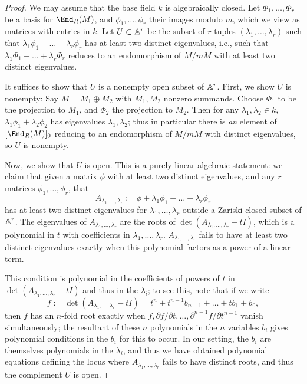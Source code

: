 \documentclass[12pt]{article}
\let\l\lambda
\numberwithin{equation}{section}
\let\d\partial
\theoremstyle{theorem}
\numberwithin{thm}{section}
\theoremstyle{definition}
\newcommand{\devlin}[1]{{\color{red} \sf $\clubsuit$ Devlin: [#1]}}
\begin{document}
\begin{proof}
  We may assume that the base field $k$ is algebraically closed.
  Let $\Phi_1,\dots,\Phi_r$ be a basis for $\End_R(M)$, and $\phi_1,\dots,\phi_r$ their images modulo $m$, which we view as matrices with entries in $k$.
  Let $U\subset \mathbb A^r$ be the subset of $r$-tuples $(\l_1,\dots,\l_r)$ such that $\l_1\phi_1+\dots+\l_r\phi_r$ has at least two distinct eigenvalues, i.e., such that $\l_1\Phi_1+\dots+\l_r\Phi_r$ reduces to an endomorphism of $M/mM$ with at least two distinct eigenvalues.

  It suffices to show that $U$ is a nonempty open subset of $\mathbb A^r$. First, we show $U$ is nonempty:
  Say $M=M_1\oplus M_2$ with $M_1,M_2$  nonzero  summands. Choose $\Phi_1$ to be the projection to $M_1$, and $\Phi_2$ the projection to $M_2$. Then for any $\l_1,\l_2\in k$, $\l_1\phi_1 + \l_2\phi_2$ has eigenvalues $\l_1,\l_2$; thus in particular there is \emph{an} element of $[\End_R(M)]_0$ reducing to an endomorphism of $M/mM$ with distinct eigenvalues, so $U$ is nonempty.

  Now, we show that $U$ is open. This is a purely linear algebraic statement: we claim that given a matrix $\phi$ with at least two distinct eigenvalues, and any $r$ matrices $\phi_1,\dots,\phi_r$, that
  $$ A_{\l_1,\dots,\l_r}:=\phi+\l_1\phi_1+\dots+\l_r\phi_r $$
  has at least two distinct eigenvalues for $\l_1,\dots,\l_r$ outside a Zariski-closed subset of $\mathbb A^r$.
  The eigenvalues of $A_{\l_1,\dots,\l_r}$ are the roots of $\det(A_{\l_1,\dots,\l_r}-t I)$, which is a polynomial in $t$ with coefficients in $\l_1,\dots,\l_r$.
$A_{\l_1,\dots,\l_r}$ fails to have at least two distinct eigenvalues exactly when this polynomial factors as a power of a linear term.

This condition is polynomial in the coefficients of powers of $t$ in $\det(A_{\l_1,\dots,\l_r}-t I)$ and thus in the $\l_i$; to see this, note that
if we write
  $$ f:=\det(A_{\l_1,\dots,\l_r}-t I)=t^n  +t^{n-1}b_{n-1}+\dots +t b_1 +b_0, $$
then $f$
  has an $n$-fold root exactly when
  $ f,\d f/\d t,\dots, \d^{n-1} f/\d t^{n-1} $
  vanish simultaneously; the resultant of these $n$ polynomials in the $n$ variables $b_i$ gives polynomial conditions in the $b_i$ for this to occur.
 In our setting, the $b_i$ are themselves polynomials in the $\l_i$, and thus we have obtained polynomial equations defining the locus where $A_{\l_1,\dots,\l_r}$ fails to have distinct roots, and thus the complement $U$ is open.
\end{proof}
\end{document}
